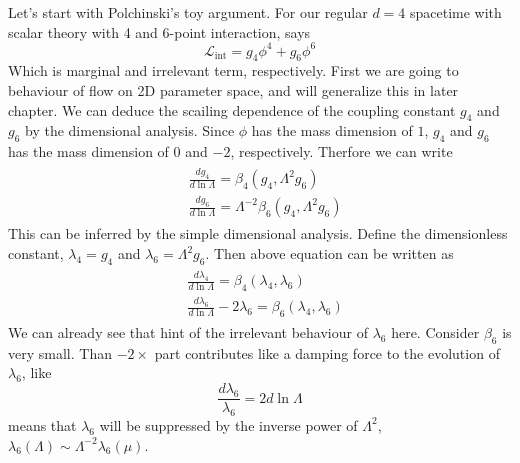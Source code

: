 \documentclass[12pt,halfline,a4paper]{ouparticle}
\begin{document}
Let's start with Polchinski's toy argument. For our regular $d=4$ spacetime with scalar theory with 4 and 6-point interaction, says
\begin{equation}
	\mathcal{L}_{\text{int}}=g_4\phi^4+g_6\phi^6
\end{equation}
Which is marginal and irrelevant term, respectively.
First we are going to behaviour of flow on 2D parameter space, and will generalize this in later chapter.
We can deduce the scailing dependence of the coupling constant $g_4$ and $g_6$ by the dimensional analysis.
Since $\phi$ has the mass dimension of $1$, $g_4$ and $g_6$ has the mass dimension of $0$ and $-2$, respectively.
Therfore we can write
\begin{align}\begin{split}
	&\frac{d g_4}{d \ln \Lambda} = \beta_4(g_4,\Lambda^2g_6)\\
	&\frac{d g_6}{d \ln \Lambda} = \Lambda^{-2}\beta_6(g_4,\Lambda^2g_6)
\end{split}\end{align}
This can be inferred by the simple dimensional analysis. Define the dimensionless constant, $\lambda_4=g_4$ and $\lambda_6=\Lambda^{2}g_6$. Then above equation can be written as
\begin{align}\begin{split}
	\label{eq:damping}
	&\frac{d \lambda_4}{d \ln \Lambda} = \beta_4(\lambda_4,\lambda_6)\\
	&\frac{d \lambda_6}{d \ln \Lambda} -2\lambda_6 = \beta_6(\lambda_4,\lambda_6)
\end{split}\end{align}
We can already see that hint of the irrelevant behaviour of $\lambda_6$ here. Consider $\beta_6$ is very small. Than $-2\times$ part contributes like a damping force to the evolution of $\lambda_6$, like
\begin{equation}
	\frac{d\lambda_6}{\lambda_6}=2d\ln\Lambda
\end{equation}
means that $\lambda_6$ will be suppressed by the inverse power of $\Lambda^2$, $\lambda_6(\Lambda)\sim\Lambda^{-2}\lambda_6(\mu)$.
\end{document}
